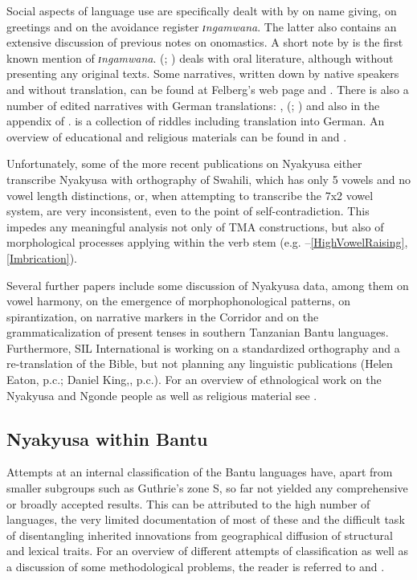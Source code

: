 Social aspects of language use are specifically dealt with by \citet{HodsonT1934} on name giving, \citet{WalshM1982} on greetings and \citet{KolbusaS2000} on the avoidance register \textit{ɪngamwana}. The latter also contains an extensive discussion of previous notes on onomastics. A short note by \citet{Cleve1904} is the first known mention of \textit{ɪngamwana}.
\citeauthor{MwakasakaC1975} (\citeyear{MwakasakaC1975}; \citeyear{MwakasakaC1978}) deals with oral literature, although without presenting any original texts. Some narratives, written down by native speakers and without translation, can be found at Felberg's web page \citep{FelbergK2010} and \citet{MwangokaNVoorhoeveJ1960a}. There is also a number of edited narratives with German translations: \citet{BergerP1933}, \citeauthor{BusseJ1942} (\citeyear{BusseJ1942}; \citeyear{BusseJ1949}) and also in the appendix of \citet{SchumannK1899}. \citet{BusseJ1957} is a collection of riddles including translation into German. An overview of educational and religious materials can be found in \citet{KroegerR2011} and \citet{FelbergK2010}.

Unfortunately, some of the more recent publications on Nyakyusa either transcribe Nyakyusa with orthography of Swahili, which has only 5 vowels and no vowel length distinctions, or, when attempting to transcribe the 7x2 vowel system, are very inconsistent, even to the point of self-contradiction. This impedes any meaningful analysis not only of TMA constructions, but also of morphological processes applying within the verb stem (e.g. --\ref{HighVowelRaising}, \ref{Imbrication}).

Several further papers include some discussion of Nyakyusa data, among them \citet{HymanL1999} on vowel harmony, \citet{HymanL2003b} on the emergence of morphophonological patterns, \citet{BoestonK2008} on spirantization, \citet{EatonH2013} on narrative markers in the Corridor and \citet{PersohnBBernanderR2016} on the grammaticalization of present tenses in southern Tanzanian Bantu languages. Furthermore, SIL International is working on a standardized orthography and a re-translation of the Bible, but not planning any linguistic publications (Helen Eaton, p.c.; Daniel King,, p.c.). For an overview of ethnological work on the Nyakyusa and Ngonde people as well as religious material see \citet{MwalilinoW1995}.
\subsection{Nyakyusa within Bantu}\label{LinguisticClassification}
Attempts at an internal classification of the Bantu languages have, apart from smaller subgroups such as Guthrie's zone S, so far not yielded any comprehensive or broadly accepted results. This can be attributed to the high number of languages, the very limited documentation of most of these and the difficult task of disentangling inherited innovations from geographical diffusion of structural and lexical traits. For an overview of different attempts of classification as well as a discussion of some methodological problems, the reader is referred to \citet[102–114]{MoehligW1981} and \citet{NurseDPhillipsonG2003b}.

